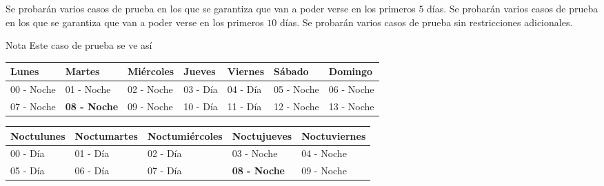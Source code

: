 \documentclass{oci}
\begin{document}
\begin{scoreDescription}
   Se probarán varios casos de prueba en los que se garantiza que van a poder verse en los primeros $5$ días.
   Se probarán varios casos de prueba en los que se garantiza que van a poder verse en los primeros $10$ días.
   Se probarán varios casos de prueba sin restricciones adicionales.
\end{scoreDescription}

\begin{sampleDescription}

Nota
Este caso de prueba se ve así
\begin{table}[h]
\begin{tabular}{|l|l|l|l|l|l|l|}
\hline
Lunes      & Martes                             & Miércoles                          & Jueves   & Viernes  & Sábado     & Domingo    \\ \hline
00 - Noche & 01 - Noche                         & 02 - Noche                         & 03 - Día & 04 - Día & 05 - Noche & 06 - Noche \\ \hline
07 - Noche & \textbf{08 - Noche} & 09 - Noche & 10 - Día & 11 - Día & 12 - Noche & 13 - Noche \\ \hline
\end{tabular}
\end{table}

\begin{table}[h]
\begin{tabular}{|l|l|l|l|l|}
\hline
Noctulunes & Noctumartes & Noctumiércoles & Noctujueves         & Noctuviernes \\ \hline
00 - Día   & 01 - Día    & 02 - Día       & 03 - Noche          & 04 - Noche   \\ \hline
05 - Día   & 06 - Día    & 07 - Día       & \textbf{08 - Noche} & 09 - Noche   \\ \hline
\end{tabular}
\end{table}

\end{sampleDescription}
\end{document}
